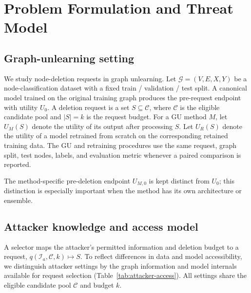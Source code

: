\section{Problem Formulation and Threat Model}
\label{sec:problem}


\subsection{Graph-unlearning setting}
We study node-deletion requests in graph unlearning. Let $\mathcal{G}=(V,E,X,Y)$ be a node-classification dataset with a fixed train / validation / test split. A canonical model trained on the original training graph produces the pre-request endpoint with utility $U_0$. A deletion request is a set $S\subseteq\mathcal{C}$, where $\mathcal{C}$ is the eligible candidate pool and $|S|=k$ is the request budget. For a GU method $M$, let $U_M(S)$ denote the utility of its output after processing $S$. Let $U_R(S)$ denote the utility of a model retrained from scratch on the corresponding retained training data. The GU and retraining procedures use the same request, graph split, test nodes, labels, and evaluation metric whenever a paired comparison is reported.

The method-specific pre-deletion endpoint $U_{M,0}$ is kept distinct from $U_0$; this distinction is especially important when the method has its own architecture or ensemble.

\subsection{Attacker knowledge and access model}
\label{sec:attacker-access}
A selector maps the attacker's permitted information and deletion budget to a request, $q(\mathcal I_a,\mathcal C,k)\mapsto S$. To reflect differences in data and model accessibility, we distinguish attacker settings by the graph information and model internals available for request selection (Table~\ref{tab:attacker-access}). All settings share the eligible candidate pool $\mathcal C$ and budget $k$.

